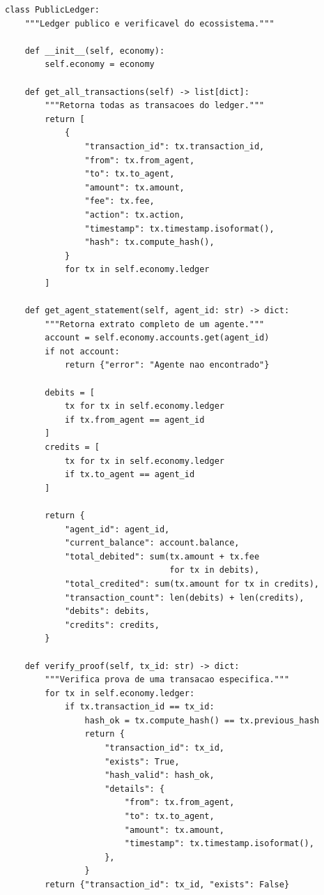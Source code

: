 \begin{lstlisting}[caption={Ledger publico e verificavel},
                  label={lst:ledger-publico}]
class PublicLedger:
    """Ledger publico e verificavel do ecossistema."""

    def __init__(self, economy):
        self.economy = economy

    def get_all_transactions(self) -> list[dict]:
        """Retorna todas as transacoes do ledger."""
        return [
            {
                "transaction_id": tx.transaction_id,
                "from": tx.from_agent,
                "to": tx.to_agent,
                "amount": tx.amount,
                "fee": tx.fee,
                "action": tx.action,
                "timestamp": tx.timestamp.isoformat(),
                "hash": tx.compute_hash(),
            }
            for tx in self.economy.ledger
        ]

    def get_agent_statement(self, agent_id: str) -> dict:
        """Retorna extrato completo de um agente."""
        account = self.economy.accounts.get(agent_id)
        if not account:
            return {"error": "Agente nao encontrado"}

        debits = [
            tx for tx in self.economy.ledger
            if tx.from_agent == agent_id
        ]
        credits = [
            tx for tx in self.economy.ledger
            if tx.to_agent == agent_id
        ]

        return {
            "agent_id": agent_id,
            "current_balance": account.balance,
            "total_debited": sum(tx.amount + tx.fee
                                 for tx in debits),
            "total_credited": sum(tx.amount for tx in credits),
            "transaction_count": len(debits) + len(credits),
            "debits": debits,
            "credits": credits,
        }

    def verify_proof(self, tx_id: str) -> dict:
        """Verifica prova de uma transacao especifica."""
        for tx in self.economy.ledger:
            if tx.transaction_id == tx_id:
                hash_ok = tx.compute_hash() == tx.previous_hash
                return {
                    "transaction_id": tx_id,
                    "exists": True,
                    "hash_valid": hash_ok,
                    "details": {
                        "from": tx.from_agent,
                        "to": tx.to_agent,
                        "amount": tx.amount,
                        "timestamp": tx.timestamp.isoformat(),
                    },
                }
        return {"transaction_id": tx_id, "exists": False}
\end{lstlisting}


